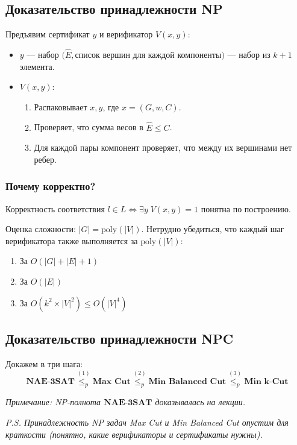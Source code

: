 \documentclass[12pt,a4paper]{article}
\begin{document}
\subsection*{Доказательство принадлежности NP}
Предъявим сертификат $y$ и верификатор $V(x, y)$:
\begin{itemize}
    \item $y$ --- набор $\big( \hat{E}, \text{список вершин для каждой компоненты} \big)$ --- набор из $k + 1$ элемента.
    \item $V(x, y)$:
    \begin{enumerate}
        \item Распаковывает $x, y$, где $x = (G, w, C)$.
        \item Проверяет, что сумма весов в $\hat{E} \le C$.
        \item Для каждой пары компонент проверяет, что между их вершинами нет ребер.
    \end{enumerate}
\end{itemize}

\subsubsection*{Почему корректно?}
Корректность соответствия $l \in L \Leftrightarrow \exists y \; V(x, y) = 1$ понятна по построению.

Оценка сложности: $|G| = \text{poly}(|V|)$. Нетрудно убедиться, что каждый шаг верификатора также выполняется за $\text{poly}(|V|)$:
\begin{enumerate}
    \item За $O(|G| + |E| + 1)$
    \item За $O(|E|)$
    \item За $O(k^2 \times |V|^2) \le O(|V|^4)$
\end{enumerate}

\subsection*{Доказательство принадлежности NPC}
Докажем в три шага:
\[
\textbf{NAE-3SAT} \overset{(1)}{\le_p} \textbf{Max Cut} \overset{(2)}{\le_p} \textbf{Min Balanced Cut} \overset{(3)}{\le_p} \textbf{Min k-Cut}
\]

\textit{Примечание: NP-полнота $\textbf{NAE-3SAT}$ доказывалась на лекции.}

\textit{P.S. Принадлежность NP задач Max Cut и Min Balanced Cut опустим для краткости (понятно, какие верификаторы и сертификаты нужны).}
\end{document}
